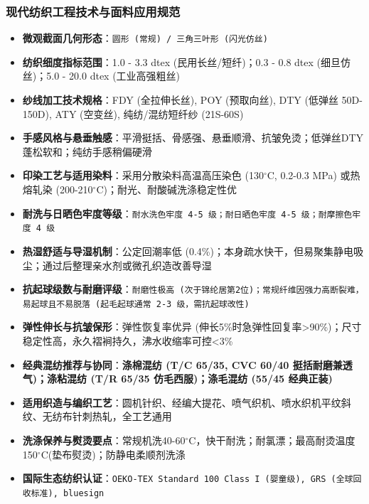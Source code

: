 \documentclass[11pt,openright,twoside,UTF8]{ctexbook}
\begin{document}
\subsubsection*{现代纺织工程技术与面料应用规范}
\begin{itemize} \setlength{\itemsep}{2pt}
    \item \textbf{微观截面几何形态}：\texttt{圆形 (常规) / 三角三叶形 (闪光仿丝)}
    \item \textbf{纺织细度指标范围}：1.0 - 3.3 dtex (民用长丝/短纤)；0.3 - 0.8 dtex (细旦仿丝)；5.0 - 20.0 dtex (工业高强粗丝)
    \item \textbf{纱线加工技术规格}：FDY (全拉伸长丝), POY (预取向丝), DTY (低弹丝 50D-150D), ATY (空变丝), 纯纺/混纺短纤纱 (21S-60S)
    \item \textbf{手感风格与悬垂触感}：平滑挺括、骨感强、悬垂顺滑、抗皱免烫；低弹丝DTY蓬松软和；纯纺手感稍偏硬滑
    \item \textbf{印染工艺与适用染料}：采用分散染料高温高压染色 (130$^\circ\mathrm{C}$, 0.2-0.3 MPa) 或热熔轧染 (200-210$^\circ\mathrm{C}$)；耐光、耐酸碱洗涤稳定性优
    \item \textbf{耐洗与日晒色牢度等级}：\texttt{耐水洗色牢度 4-5 级；耐日晒色牢度 4-5 级；耐摩擦色牢度 4 级}
    \item \textbf{热湿舒适与导湿机制}：公定回潮率低 (0.4\%)；本身疏水快干，但易聚集静电吸尘；通过后整理亲水剂或微孔织造改善导湿
    \item \textbf{抗起球级数与耐磨评级}：\texttt{耐磨性极高 (次于锦纶居第2位)；常规纤维因强力高断裂难，易起球且不易脱落 (起毛起球通常 2-3 级，需抗起球改性)}
    \item \textbf{弹性伸长与抗皱保形}：弹性恢复率优异 (伸长5\%时急弹性回复率\textgreater{}90\%)；尺寸稳定性高，永久褶裥持久，沸水收缩率可控\textless{}3\%
    \item \textbf{经典混纺推荐与协同}：\textbf{涤棉混纺 (T/C 65/35, CVC 60/40 挺括耐磨兼透气)；涤粘混纺 (T/R 65/35 仿毛西服)；涤毛混纺 (55/45 经典正装)}
    \item \textbf{适用织造与编织工艺}：圆机针织、经编大提花、喷气织机、喷水织机平纹斜纹、无纺布针刺热轧，全工艺通用
    \item \textbf{洗涤保养与熨烫要点}：常规机洗40-60$^\circ\mathrm{C}$，快干耐洗；耐氯漂；最高耐烫温度150$^\circ\mathrm{C}$(垫布熨烫)；防静电柔顺剂洗涤
    \item \textbf{国际生态纺织认证}：\texttt{OEKO-TEX Standard 100 Class I (婴童级), GRS (全球回收标准), bluesign}
\end{itemize}
\vspace{0.2cm}
\end{document}
